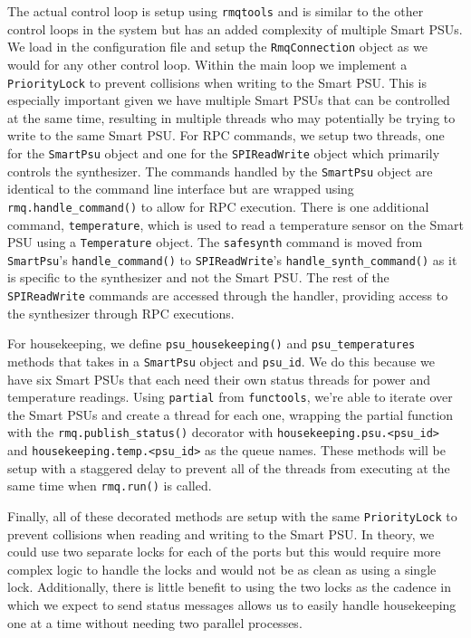 The actual control loop is setup using \texttt{rmqtools} and is similar to the other control loops in the system but has an added complexity of multiple Smart PSUs. 
We load in the configuration file and setup the \texttt{RmqConnection} object as we would for any other control loop.
Within the main loop we implement a \texttt{PriorityLock} to prevent collisions when writing to the Smart PSU.
This is especially important given we have multiple Smart PSUs that can be controlled at the same time, resulting in multiple threads who may potentially be trying to write to the same Smart PSU.
For RPC commands, we setup two threads, one for the \texttt{SmartPsu} object and one for the \texttt{SPIReadWrite} object which primarily controls the synthesizer.
The commands handled by the \texttt{SmartPsu} object are identical to the command line interface but are wrapped using \texttt{rmq.handle\_command()} to allow for RPC execution.
There is one additional command, \texttt{temperature}, which is used to read a temperature sensor on the Smart PSU using a \texttt{Temperature} object.
The \texttt{safesynth} command is moved from  \texttt{SmartPsu}'s \texttt{handle\_command()} to \texttt{SPIReadWrite}'s \texttt{handle\_synth\_command()} as it is specific to the synthesizer and not the Smart PSU.
The rest of the \texttt{SPIReadWrite} commands are accessed through the handler, providing access to the synthesizer through RPC executions.

For housekeeping, we define \texttt{psu\_housekeeping()} and \texttt{psu\_temperatures} methods that takes in a \texttt{SmartPsu} object and \texttt{psu\_id}.
We do this because we have six Smart PSUs that each need their own status threads for power and temperature readings. 
Using \texttt{partial} from \texttt{functools}, we're able to iterate over the Smart PSUs and create a thread for each one, wrapping the partial function with the \texttt{rmq.publish\_status()} decorator with \texttt{housekeeping.psu.<psu\_id>} and \texttt{housekeeping.temp.<psu\_id>} as the queue names.
These methods will be setup with a staggered delay to prevent all of the threads from executing at the same time when \texttt{rmq.run()} is called. 

Finally, all of these decorated methods are setup with the same \texttt{PriorityLock} to prevent collisions when reading and writing to the Smart PSU.
In theory, we could use two separate locks for each of the ports but this would require more complex logic to handle the locks and would not be as clean as using a single lock.
Additionally, there is little benefit to using the two locks as the cadence in which we expect to send status messages allows us to easily handle housekeeping one at a time without needing two parallel processes. 

